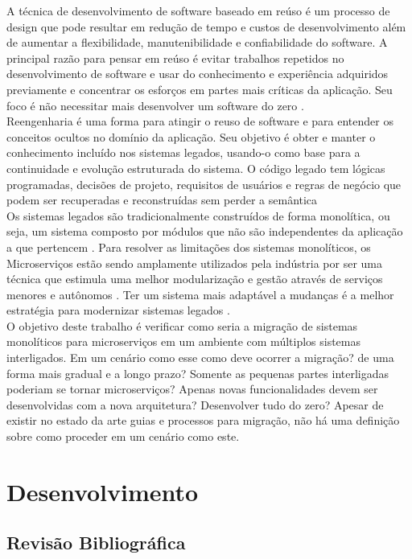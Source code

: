 \documentclass[12pt]{article}
\begin{document}
A técnica de desenvolvimento de software baseado em reúso é um processo de design que pode resultar em redução de tempo e custos de desenvolvimento além de aumentar a flexibilidade, manutenibilidade e confiabilidade do software. A principal razão para pensar em reúso é evitar trabalhos repetidos no desenvolvimento de software e usar do conhecimento e experiência adquiridos previamente e concentrar os esforços em partes mais críticas da aplicação. Seu foco é não necessitar mais desenvolver um software do zero \cite{Yang}.  
\\
Reengenharia é uma forma para atingir o reuso de software e para entender os conceitos ocultos no domínio da aplicação. Seu objetivo é obter e manter o conhecimento incluído nos sistemas legados, usando-o como base para a continuidade e evolução estruturada do sistema. O código legado tem lógicas programadas, decisões de projeto, requisitos de usuários e regras de negócio que podem ser recuperadas e reconstruídas sem perder a semântica \cite{Garcia2004a}
\\
Os sistemas legados são tradicionalmente construídos de forma monolítica, ou seja, um sistema composto por módulos que não são independentes da aplicação a que pertencem \cite{Dragoni2017}. Para resolver as limitações dos sistemas monolíticos, os Microserviços estão sendo amplamente utilizados pela indústria por ser uma técnica que estimula uma melhor modularização e gestão através de serviços menores e autônomos \cite{Carvalho2019}. Ter um sistema mais adaptável a mudanças é a melhor estratégia para modernizar sistemas legados \cite{Kamimura2019a}.
\\
O objetivo deste trabalho é verificar como seria a migração de sistemas monolíticos para microserviços em um ambiente com múltiplos sistemas interligados. Em um cenário como esse como deve ocorrer a migração? de uma forma mais gradual e a longo prazo? Somente as pequenas partes interligadas poderiam se tornar microserviços? Apenas novas funcionalidades devem ser desenvolvidas com a nova arquitetura? Desenvolver tudo do zero? Apesar de existir no estado da arte guias e processos para migração, não há uma definição sobre como proceder em um cenário como este.
 

\section{Desenvolvimento} \label{sec:firstpage}

\subsection{Revisão Bibliográfica}
\end{document}

